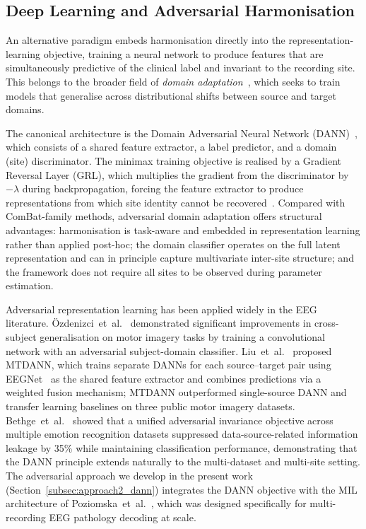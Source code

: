 \documentclass[preprint,12pt]{elsarticle}
\begin{document}
\subsection{Deep Learning and Adversarial Harmonisation}
\label{subsec:dann_related}

An alternative paradigm embeds harmonisation directly into the
representation-learning objective, training a neural network to
produce features that are simultaneously predictive of the clinical
label and invariant to the recording site.
This belongs to the broader field of \emph{domain
adaptation}~\cite{ganin2016domain}, which seeks to train models that
generalise across distributional shifts between source and target
domains.

The canonical architecture is the Domain Adversarial Neural Network
(DANN)~\cite{ganin2016domain}, which consists of a shared feature
extractor, a label predictor, and a domain (site) discriminator.
The minimax training objective is realised by a Gradient Reversal
Layer (GRL), which multiplies the gradient from the discriminator by
$-\lambda$ during backpropagation, forcing the feature extractor to
produce representations from which site identity cannot be
recovered~\cite{ganin2016domain}.
Compared with ComBat-family methods, adversarial domain adaptation
offers structural advantages: harmonisation is task-aware and embedded
in representation learning rather than applied post-hoc; the domain
classifier operates on the full latent representation and can in
principle capture multivariate inter-site structure; and the framework
does not require all sites to be observed during parameter estimation.

Adversarial representation learning has been applied widely in the
EEG literature.
\"{O}zdenizci~et~al.~\cite{ozdenizci2020invariant} demonstrated
significant improvements in cross-subject generalisation on motor
imagery tasks by training a convolutional network with an adversarial
subject-domain classifier.
Liu~et~al.~\cite{liu2023multisource} proposed MTDANN, which trains
separate DANNs for each source--target pair using
EEGNet~\cite{lawhern2018eegnet} as the shared feature extractor and
combines predictions via a weighted fusion mechanism; MTDANN
outperformed single-source DANN and transfer learning baselines on
three public motor imagery datasets.
Bethge~et~al.~\cite{bethge2022multidomain} showed that a unified
adversarial invariance objective across multiple emotion recognition
datasets suppressed data-source-related information leakage by 35\%
while maintaining classification performance, demonstrating that the
DANN principle extends naturally to the multi-dataset and multi-site
setting.
The adversarial approach we develop in the present work
(Section~\ref{subsec:approach2_dann}) integrates the DANN objective
with the MIL architecture of Poziomska~et~al.\
\cite{poziomska2026quantity}, which was designed specifically for
multi-recording EEG pathology decoding at scale.
\end{document}

